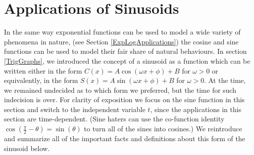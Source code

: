 \section{Applications of Sinusoids}
\label{Sinusoid}

In the same way exponential functions can be used to model a wide variety of phenomena in nature, (see Section \ref{ExpLogApplications}) the cosine and sine functions can be used to model their fair share of natural behaviours. In section \ref{TrigGraphs}, we introduced the concept of a sinusoid as a function which can be written either in the form $C(x) = A \cos(\omega x + \phi) + B$ for $\omega > 0$ or equivalently, in the form $S(x) = A \sin(\omega x + \phi) + B$ for $\omega > 0$.  At the time, we remained undecided as to which form we preferred, but the time for such indecision is over.  For clarity of exposition we focus on the sine function in this section and switch to the independent variable $t$, since the applications in this section are time-dependent. (Sine haters can use the co-function identity $\cos\left(\frac{\pi}{2} - \theta\right) = \sin(\theta)$ to turn all of the sines into cosines.) We reintroduce and summarize all of the important facts and definitions about this form of the sinusoid below.

\smallskip


